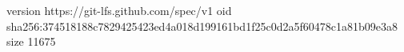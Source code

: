version https://git-lfs.github.com/spec/v1
oid sha256:374518188c7829425423ed4a018d199161bd1f25c0d2a5f60478c1a81b09e3a8
size 11675
